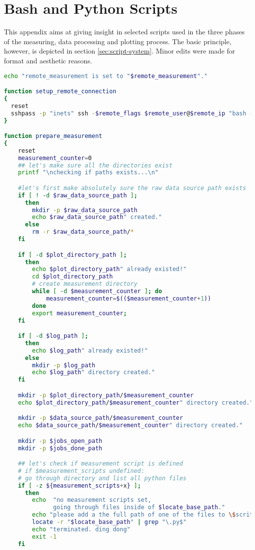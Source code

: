\chapter{Bash and Python Scripts}

This appendix aims at giving insight in selected scripts used in the three phases of the measuring, data processing and plotting process. The basic principle, however, is depicted in section \ref{sec:script-system}. Minor edits were made for format and aesthetic reasons.

\begin{lstlisting}[language=Bash,caption=measure.sh]
echo "remote_measurement is set to "$remote_measurement"."

function setup_remote_connection
{
  reset
  sshpass -p "inets" ssh -$remote_flags $remote_user@$remote_ip "bash -s" < remote_measurement_$link.sh
}

function prepare_measurement
{
    reset
    measurement_counter=0
    ## let's make sure all the directories exist
    printf "\nchecking if paths exists...\n"

    #let's first make absolutely sure the raw data source path exists
    if [ ! -d $raw_data_source_path ];
      then
        mkdir -p $raw_data_source_path
        echo $raw_data_source_path" created."
      else
        rm -r $raw_data_source_path/*
    fi

    if [ -d $plot_directory_path ];
      then
        echo $plot_directory_path" already existed!"
        cd $plot_directory_path
        # create measurement directory
        while [ -d $measurement_counter ]; do
            measurement_counter=$(($measurement_counter+1))
        done
        export measurement_counter;
    fi

    if [ -d $log_path ];
      then
        echo $log_path" already existed!"
      else
        mkdir -p $log_path
        echo $log_path" directory created."
    fi

    mkdir -p $plot_directory_path/$measurement_counter
    echo $plot_directory_path/$measurement_counter" directory created."

    mkdir -p $data_source_path/$measurement_counter
    echo $data_source_path/$measurement_counter" directory created."

    mkdir -p $jobs_open_path
    mkdir -p $jobs_done_path

    ## let's check if measurement script is defined
    # if $measurement_scripts undefined:
    # go through directory and list all python files
    if [ -z ${measurement_scripts+x} ];
      then
        echo  "no measurement scripts set,
              going through files inside of $locate_base_path."
        echo "please add a the full path of one of the files to \$scritps."
        locate -r "$locate_base_path" | grep "\.py$"
        echo "terminated. ding dong"
        exit -1
    fi


\end{lstlisting}

